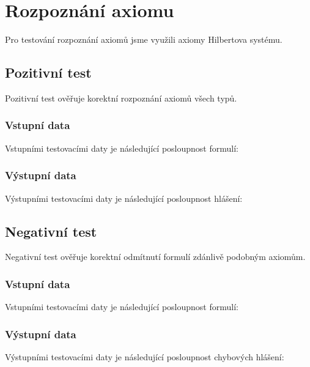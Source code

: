 \documentclass[thesis=B,czech,hidelinks]{thesis}[2012/06/26]
\begin{document}
\section{Rozpoznání axiomu}

Pro testování rozpoznání axiomů jsme využili axiomy Hilbertova systému.

\subsection{Pozitivní test}

Pozitivní test ověřuje korektní rozpoznání axiomů všech typů.

\subsubsection{Vstupní data}

Vstupními testovacími daty je následující posloupnost formulí:



\subsubsection{Výstupní data}

Výstupními testovacími daty je následující posloupnost hlášení:



\subsection{Negativní test}

Negativní test ověřuje korektní odmítnutí formulí zdánlivě podobným axiomům.

\subsubsection{Vstupní data}

Vstupními testovacími daty je následující posloupnost formulí:



\subsubsection{Výstupní data}

Výstupními testovacími daty je následující posloupnost chybových hlášení:
\end{document}
